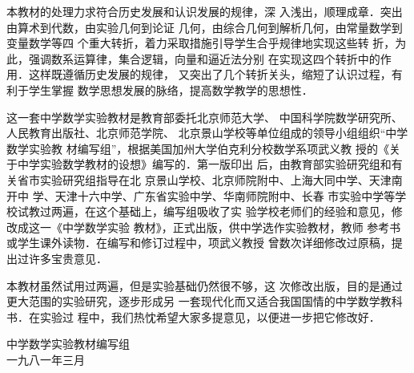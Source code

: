     本教材的处理力求符合历史发展和认识发展的规律，深
入浅出，顺理成章．突出由算术到代数，由实验几何到论证
几何，由综合几何到解析几何，由常量数学到变量数学等四
个重大转折，着力采取措施引导学生合乎规律地实现这些转
折，为此，强调数系运算律，集合逻辑，向量和逼近法分别
在实现这四个转折中的作用．这样既遵循历史发展的规律，
又突出了几个转折关头，缩短了认识过程，有利于学生掌握
数学思想发展的脉络，提高数学教学的思想性．

这一套中学数学实验教材是教育部委托北京师范大学、
中国科学院数学研究所、人民教育出版社、北京师范学院、
北京景山学校等单位组成的领导小组组织“中学数学实验教
材编写组”，根据美国加州大学伯克利分校数学系项武义教
授的《关于中学实验数学教材的设想》编写的．第一版印出
后，由教育部实验研究组和有关省市实验研究组指导在北
京景山学校、北京师院附中、上海大同中学、天津南开中
学、天津十六中学、广东省实验中学、华南师院附中、长春
市实验中学等学校试教过两遍，在这个基础上，编写组吸收了实
验学校老师们的经验和意见，修改成这一《中学数学实验
教材》，正式出版，供中学选作实验教材，教师
参考书或学生课外读物．在编写和修订过程中，项武义教授
曾数次详细修改过原稿，提出过许多宝贵意见．

    本教材虽然试用过两遍，但是实验基础仍然很不够，这
次修改出版，目的是通过更大范围的实验研究，逐步形成另
一套现代化而又适合我国国情的中学数学教科书．在实验过
程中，我们热忱希望大家多提意见，以便进一步把它修改好．

\begin{flushright}
    中学数学实验教材编写组\\
    一九八一年三月
\end{flushright}







